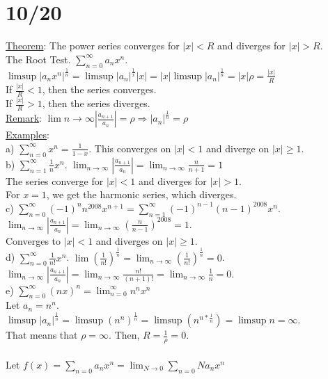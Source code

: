 \documentclass[11pt]{article}
\begin{document}
\section*{10/20}
	\underline{Theorem}: The power series converges for $|x| < R$ and diverges
	for $|x| > R$.\\
	The Root Test. $\sum_{n = 0}^{\infty}{a_nx^n}.$\\
	$\limsup |a_nx^n|^{\frac{1}{n}} = \limsup |a_n|^{\frac{1}{x}}|x| = |x|
	\limsup|a_n|^{\frac{1}{n}} = |x|\rho = \frac{|x|}{R}$\\
	If $\frac{|x|}{R} < 1$, then the series converges.\\
	If $\frac{|x|}{R} > 1$, then the series diverges.\\
	\underline{Remark}: $\lim{n \to \infty}|\frac{a_{n+1}}{a_n}| = \rho
	\Rightarrow |a_n|^{\frac{1}{n}} = \rho$\\
	\underline{Examples}:\\
	a) $\sum_{n = 0}^{\infty}{x^n} = \frac{1}{1-x}$. This converges on
	$|x| < 1$  and diverge on $|x| \ge 1$.\\
	b) $\sum_{n = 1}^{\infty}{\frac{1}{n} x^n}$. $\lim_{n \to \infty}
	|\frac{a_{n+1}}{a_n}| = \lim_{n \to \infty}{\frac{n}{n + 1} = 1}$\\
	The series converge for $|x| < 1$ and diverges for $|x| > 1$.\\
	For $x = 1$, we get the harmonic series, which diverges.\\
	c) $\sum_{n = 0}^{\infty}{(-1)^n n^2008 x^{n+1}} = \sum_{n = 1}^{\infty}
	(-1)^{n - 1}(n - 1)^{2008}x^n$.\\
	$\lim_{n \to \infty}{|\frac{a_{n+1}}{a_n}|} = \lim_{n \to \infty}{(\frac{n}
	{n-1})^{2008}} = 1$.\\
	Converges to $|x| < 1$ and diverges on $|x| \ge 1$.\\
	d) $\sum_{n = 0}^{\infty}{\frac{1}{n!} x^n}$. 
	$\lim{(\frac{1}{n!})^{\frac{1}{n}}} = \lim_{n \to \infty}(\frac{1}{n!})^
	{\frac{1}{n}} = 0$.\\
	$\lim_{n \to \infty}{|\frac{a_{n+1}}{a_n}|} = \lim_{n \to \infty}
	{\frac{n!}{(n+1)!}} = \lim_{n \to \infty}{\frac{1}{n}} = 0$.\\
	e) $\sum_{n=0}^{\infty}{(nx)^n} = \lim_{n = 0}^{\infty}{n^nx^n}$\\
	Let $a_n = n^n$. \\
	$\limsup|a_n|^{\frac{1}{n}} = \limsup(n^n)^{\frac{1}{n}} = \limsup(n^{n*
	\frac{1}{n}}) = \limsup n = \infty$.\\
	That means that $\rho = \infty$. Then, $R = \frac{1}{\rho} = 0$.\\\\
	Let $f(x) = \sum_{n = 0}{a_n x^n} = \lim_{N \to 0}{\sum_{n = 0}{N}{a_nx^n}}$
\end{document}
